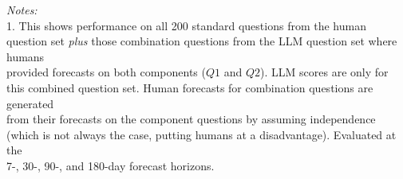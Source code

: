 \begin{table}[ht!]
{\begin{tabular}
\bottomrule
\end{tabular}
}
\begin{minipage}{\textwidth}
{\tiny
    \textit{Notes:} \\
    \vspace{-2mm}
    1. This shows performance on all 200 standard questions from the human question set \textit{plus} those combination questions from the LLM question set where humans\\\vspace{-2mm}provided forecasts on both components ($Q1$ and $Q2$). LLM scores are only for this combined question set. Human forecasts for combination questions are generated\\\vspace{-2mm}from their forecasts on the component questions by assuming independence (which is not always the case, putting humans at a disadvantage). Evaluated at the\\\vspace{-2mm} 7-, 30-, 90-, and 180-day forecast horizons.\\
}
\end{minipage}
\end{table}
